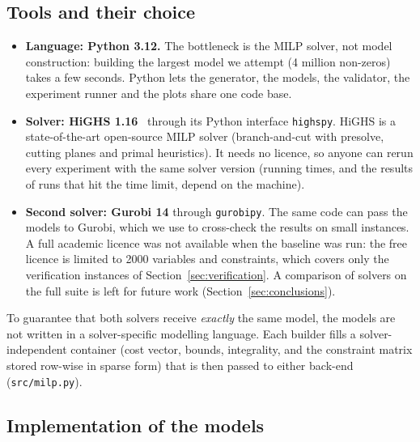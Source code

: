 
\subsection{Tools and their choice}

\begin{itemize}
  \item \textbf{Language: Python 3.12.} The bottleneck is the MILP solver,
    not model construction: building the largest model we attempt (4 million
    non-zeros) takes a few seconds. Python lets the generator, the models,
    the validator, the experiment runner and the plots share one code base.
  \item \textbf{Solver: HiGHS 1.16}~\cite{huangfu2018} through its Python
    interface \texttt{highspy}. HiGHS is a state-of-the-art open-source
    MILP solver (branch-and-cut with presolve, cutting planes and primal
    heuristics). It needs no licence, so anyone can rerun every experiment with the same solver version (running
    times, and the results of runs that hit the time limit, depend on the
    machine).
  \item \textbf{Second solver: Gurobi 14} through \texttt{gurobipy}. The same
    code can pass the models to Gurobi, which we use to cross-check the
    results on small instances. A full academic licence was not available
    when the baseline was run: the free licence is limited to 2000 variables
    and constraints, which covers only the verification instances of
    Section~\ref{sec:verification}. A comparison of solvers on the full
    suite is left for future work (Section~\ref{sec:conclusions}).
\end{itemize}

To guarantee that both solvers receive \emph{exactly} the same model, the
models are not written in a solver-specific modelling language. Each builder
fills a solver-independent container (cost vector, bounds, integrality, and
the constraint matrix stored row-wise in sparse form) that is then passed to
either back-end (\texttt{src/milp.py}).

\subsection{Implementation of the models}


